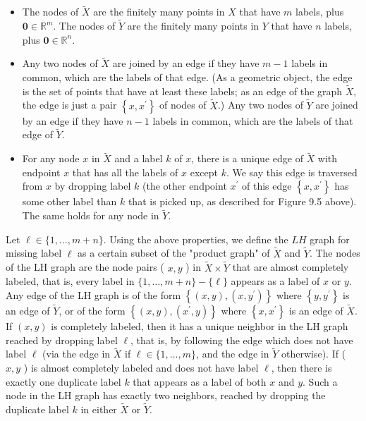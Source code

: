\documentclass[12pt]{article}
\begin{document}
\begin{itemize}
  \item The nodes of $\tilde{X}$ are the finitely many points in $X$ that have $m$ labels, plus $\mathbf{0} \in \mathbb{R}^{m}$. The nodes of $\tilde{Y}$ are the finitely many points in $Y$ that have $n$ labels, plus $\mathbf{0} \in \mathbb{R}^{n}$.
  \item Any two nodes of $\tilde{X}$ are joined by an edge if they have $m-1$ labels in common, which are the labels of that edge. (As a geometric object, the edge is the set of points that have at least these labels; as an edge of the graph $\tilde{X}$, the edge is just a pair $\left\{x, x^{\prime}\right\}$ of nodes of $\tilde{X}$.) Any two nodes of $\tilde{Y}$ are joined by an edge if they have $n-1$ labels in common, which are the labels of that edge of $\tilde{Y}$.
  \item For any node $x$ in $\tilde{X}$ and a label $k$ of $x$, there is a unique edge of $\tilde{X}$ with endpoint $x$ that has all the labels of $x$ except $k$. We say this edge is traversed from $x$ by dropping label $k$ (the other endpoint $x^{\prime}$ of this edge $\left\{x, x^{\prime}\right\}$ has some other label than $k$ that is picked up, as described for Figure 9.5 above). The same holds for any node in $\tilde{Y}$.
\end{itemize}

Let $\ell \in\{1, \ldots, m+n\}$. Using the above properties, we define the $L H$ graph for missing label $\ell$ as a certain subset of the "product graph" of $\tilde{X}$ and $\tilde{Y}$. The nodes of the LH graph are the node pairs ( $x, y$ ) in $\tilde{X} \times \tilde{Y}$ that are almost completely labeled, that is, every label in $\{1, \ldots, m+n\}-\{\ell\}$ appears as a label of $x$ or $y$. Any edge of the LH graph is of the form $\left\{(x, y),\left(x, y^{\prime}\right)\right\}$ where $\left\{y, y^{\prime}\right\}$ is an edge of $\tilde{Y}$, or of the form $\left\{(x, y),\left(x^{\prime}, y\right)\right\}$ where $\left\{x, x^{\prime}\right\}$ is an edge of $\tilde{X}$. If $(x, y)$ is completely labeled, then it has a unique neighbor in the LH graph reached by dropping label $\ell$, that is, by following the edge which does not have label $\ell$ (via the edge in $\tilde{X}$ if $\ell \in\{1, \ldots, m\}$, and the edge in $\tilde{Y}$ otherwise). If ( $x, y$ ) is almost completely labeled and does not have label $\ell$, then there is exactly one duplicate label $k$ that appears as a label of both $x$ and $y$. Such a node in the LH graph has exactly two neighbors, reached by dropping the duplicate label $k$ in either $\tilde{X}$ or $\tilde{Y}$.
\end{document}
